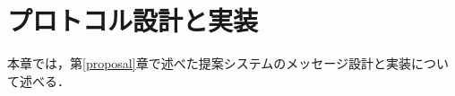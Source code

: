 \chapter{プロトコル設計と実装}
\label{implementation}
本章では，第\ref{proposal}章で述べた提案システムのメッセージ設計と実装について述べる．






